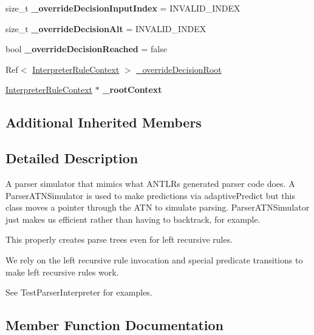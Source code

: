 \begin{DoxyCompactItemize}
size\+\_\+t {\bfseries \+\_\+override\+Decision\+Input\+Index} = I\+N\+V\+A\+L\+I\+D\+\_\+\+I\+N\+D\+EX
\item 
\mbox{\label{classantlr4_1_1ParserInterpreter_a46022fc5efc016e4cb808cb1988ae6da}} 
size\+\_\+t {\bfseries \+\_\+override\+Decision\+Alt} = I\+N\+V\+A\+L\+I\+D\+\_\+\+I\+N\+D\+EX
\item 
\mbox{\label{classantlr4_1_1ParserInterpreter_a7e972c20a2d191f6625837a9cb198dfe}} 
bool {\bfseries \+\_\+override\+Decision\+Reached} = false
\item 
Ref$<$ \hyperlink{classantlr4_1_1InterpreterRuleContext}{Interpreter\+Rule\+Context} $>$ \hyperlink{classantlr4_1_1ParserInterpreter_a6380e8d9f1a250454fe1299845a57f6f}{\+\_\+override\+Decision\+Root}
\item 
\mbox{\label{classantlr4_1_1ParserInterpreter_a2b66f66b952a27fa58a111c4440c3f0c}} 
\hyperlink{classantlr4_1_1InterpreterRuleContext}{Interpreter\+Rule\+Context} $\ast$ {\bfseries \+\_\+root\+Context}
\end{DoxyCompactItemize}
\subsection*{Additional Inherited Members}


\subsection{Detailed Description}
A parser simulator that mimics what A\+N\+T\+LR\textquotesingle{}s generated parser code does. A Parser\+A\+T\+N\+Simulator is used to make predictions via adaptive\+Predict but this class moves a pointer through the A\+TN to simulate parsing. Parser\+A\+T\+N\+Simulator just makes us efficient rather than having to backtrack, for example. 

This properly creates parse trees even for left recursive rules.

We rely on the left recursive rule invocation and special predicate transitions to make left recursive rules work.

See Test\+Parser\+Interpreter for examples. 

\subsection{Member Function Documentation}
\mbox{\label{classantlr4_1_1ParserInterpreter_abf60cba91e262b5384871b3b7412367f}} 
